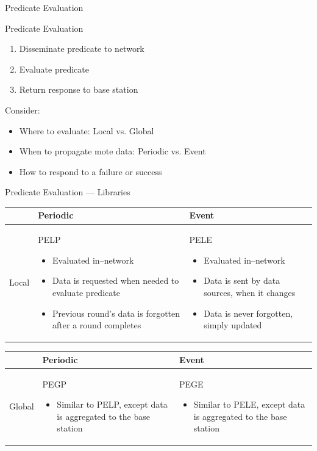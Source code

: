 \documentclass[usenames,dvipsnames]{beamer}
\newcommand{\subtitleframe}[1]{\begin{frame}\begin{block}{\centering\Large \vspace{1em} #1 \vspace{1em}}\end{block}\end{frame}}
\begin{document}
\subtitleframe{Predicate Evaluation}

\begin{frame}{Predicate Evaluation}
	\begin{enumerate}
		\item Disseminate predicate to network
		\item Evaluate predicate
		\item Return response to base station
	\end{enumerate}
\vspace{1em}

Consider:
	\begin{itemize}
		\item Where to evaluate: Local vs. Global
		\item When to propagate mote data: Periodic vs. Event
		\item How to respond to a failure or success
	\end{itemize}
\end{frame}

\begin{frame}[allowframebreaks]{Predicate Evaluation --- Libraries}
\begin{table}[H]
\centering
\begin{tabular}{| l | p{4.2cm} | p{4.2cm} |}
\hline
~ & Periodic & Event\\
\hline
Local & PELP
	\begin{itemize}
		\item Evaluated in--network
		\item Data is requested when needed to evaluate predicate
		\item Previous round's data is forgotten after a round completes
	\end{itemize}
 & PELE
	\begin{itemize}
		\item Evaluated in--network
		\item Data is sent by data sources, when it changes
		\item Data is never forgotten, simply updated
	\end{itemize}\\
\hline
\end{tabular}
\end{table}

\begin{table}[H]
\centering
\begin{tabular}{| l | p{4.2cm} | p{4.2cm} |}
\hline
~ & Periodic & Event\\
\hline
Global & PEGP
	\begin{itemize}
		\item Similar to PELP, except data is aggregated to the base station
	\end{itemize}
 & PEGE
	\begin{itemize}
		\item Similar to PELE, except data is aggregated to the base station
	\end{itemize}\\
\hline
\end{tabular}
\end{table}
\end{frame}
\end{document}
